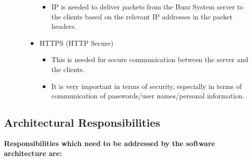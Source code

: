 \documentclass[11pt]{article}
\begin{document}
\begin{itemize}
\begin{itemize}
\begin{itemize}
\begin{itemize}
							\item IP is needed to deliver packets from the Buzz System server to the clients based on the relevant IP addresses in the packet headers.
						\end{itemize}
					\item HTTPS (HTTP Secure)
						\begin{itemize}
							\item This is needed for secure communication between the server and the clients. 
							\item It is very important in terms of security, especially in terms of communication of passwords/user names/personal information.
						\end{itemize}
				\end{itemize}
		\end{itemize}
	\end{itemize}

	\newpage
	\begin{center}
	\section{\textbf{\huge{Architectural Responsibilities}}}
	\end{center}
	
	\textbf{Responsibilities which need to be addressed by the software architecture are:}
	\\
	
\end{document}
